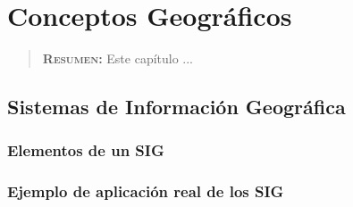 

\chapter{Conceptos Geográficos}
\label{ch:sig}

\begin{quote}
  {\bf\textsc{Resumen:}} Este capítulo ...
\end{quote}


\section{Sistemas de Información Geográfica}





\subsection{Elementos de un SIG}


\subsection{Ejemplo de aplicación real de los SIG}



